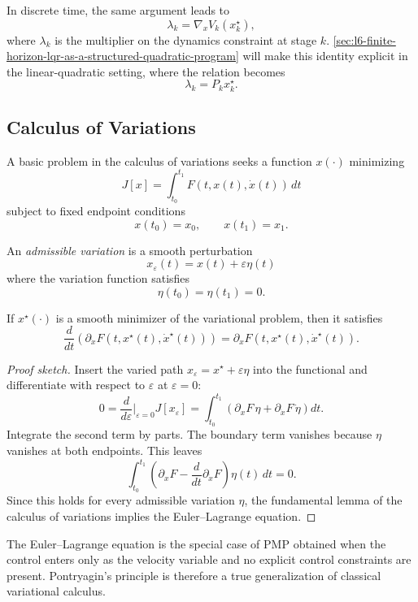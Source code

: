 \begin{remark}
	In discrete time, the same argument leads to
	\[
		\lambda_k = \nabla_x V_k(x_k^\star),
	\]
	where $\lambda_k$ is the multiplier on the dynamics constraint at stage $k$. \autoref{sec:l6-finite-horizon-lqr-as-a-structured-quadratic-program} will make this identity explicit in the linear-quadratic setting, where the relation becomes
	\[
		\lambda_k=P_kx_k^\star.
	\]
\end{remark}

\subsection{Calculus of Variations}
\label{sec:l4-calculus-of-variations}

\begin{definition}\label{def:l4-variational-problem}
	A basic problem in the calculus of variations seeks a function $x(\cdot)$ minimizing
	\[
		J[x]=\int_{t_0}^{t_1} F(t,x(t),\dot x(t))\,dt
	\]
	subject to fixed endpoint conditions
	\[
		x(t_0)=x_0,
		\qquad
		x(t_1)=x_1.
	\]
\end{definition}

\begin{definition}\label{def:l4-admissible-variation}
	An \emph{admissible variation} is a smooth perturbation
	\[
		x_\varepsilon(t)=x(t)+\varepsilon \eta(t)
	\]
	where the variation function satisfies
	\[
		\eta(t_0)=\eta(t_1)=0.
	\]
\end{definition}

\begin{theorem}\label{thm:l4-euler-lagrange-equation}
	If $x^\star(\cdot)$ is a smooth minimizer of the variational problem, then it satisfies
	\[
		\frac{d}{dt}\left(\partial_{\dot x} F(t,x^\star(t),\dot x^\star(t))\right)
		=
		\partial_x F(t,x^\star(t),\dot x^\star(t)).
	\]
\end{theorem}
\begin{proof}[Proof sketch]
	Insert the varied path $x_\varepsilon=x^\star+\varepsilon \eta$ into the functional and differentiate with respect to $\varepsilon$ at $\varepsilon=0$:
	\[
		0=\frac{d}{d\varepsilon}\Big|_{\varepsilon=0}J[x_\varepsilon]
		=
		\int_{t_0}^{t_1}
		\left(
			\partial_x F \,\eta + \partial_{\dot x} F\, \dot \eta
		\right)dt.
	\]
	Integrate the second term by parts. The boundary term vanishes because $\eta$ vanishes at both endpoints. This leaves
		\[
			\int_{t_0}^{t_1}
			\left(
				\partial_x F - \frac{d}{dt}\partial_{\dot x} F
			\right)\eta(t)\,dt=0.
		\]
	Since this holds for every admissible variation $\eta$, the fundamental lemma of the calculus of variations implies the Euler--Lagrange equation.
\end{proof}

\begin{remark}
	The Euler--Lagrange equation is the special case of PMP obtained when the control enters only as the velocity variable and no explicit control constraints are present. Pontryagin's principle is therefore a true generalization of classical variational calculus.
\end{remark}
